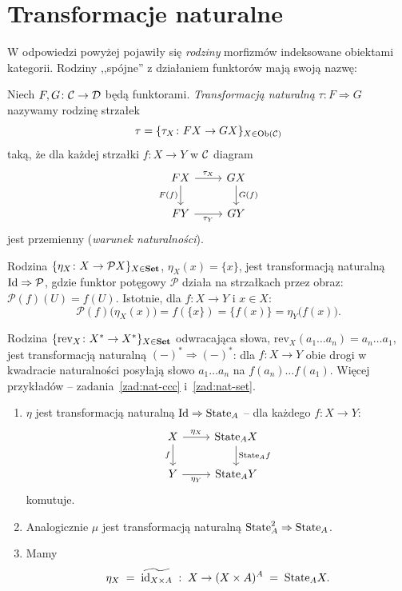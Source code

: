 \section{Transformacje naturalne}

W odpowiedzi powyżej pojawiły się \emph{rodziny} morfizmów indeksowane obiektami kategorii. Rodziny ,,spójne'' z działaniem funktorów mają swoją nazwę:

\begin{definicja}
Niech $F, G \colon \mathcal{C} \to \mathcal{D}$ będą funktorami. \emph{Transformacją naturalną} $\tau \colon F \Rightarrow G$ nazywamy rodzinę strzałek
\[
\tau = \{\tau_X \colon F X \to G X\}_{X \in \mathrm{Ob}(\mathcal{C})}
\]
taką, że dla każdej strzałki $f \colon X \to Y$ w $\mathcal{C}$ diagram
\[
\begin{tikzcd}
F X \arrow[r, "\tau_X"] \arrow[d, "F(f)"'] & G X \arrow[d, "G(f)"] \\
F Y \arrow[r, "\tau_Y"'] & G Y
\end{tikzcd}
\]
jest przemienny (\emph{warunek naturalności}).
\end{definicja}

\begin{przyklad}
Rodzina $\{\eta_X \colon X \to \mathcal{P}X\}_{X \in \mathbf{Set}}$, $\eta_X(x) = \{x\}$, jest transformacją naturalną $\mathrm{Id} \Rightarrow \mathcal{P}$, gdzie funktor potęgowy $\mathcal{P}$ działa na strzałkach przez obraz: $\mathcal{P}(f)(U) = f(U)$. Istotnie, dla $f \colon X \to Y$ i $x \in X$:
\[
\mathcal{P}(f)\bigl(\eta_X(x)\bigr) = f(\{x\}) = \{f(x)\} = \eta_Y\bigl(f(x)\bigr).
\]
\end{przyklad}

\begin{przyklad}
Rodzina $\{\mathrm{rev}_X \colon X^* \to X^*\}_{X \in \mathbf{Set}}$ odwracająca słowa, $\mathrm{rev}_X(a_1 \ldots a_n) = a_n \ldots a_1$, jest transformacją naturalną $(-)^* \Rightarrow (-)^*$: dla $f \colon X \to Y$ obie drogi w kwadracie naturalności posyłają słowo $a_1 \ldots a_n$ na $f(a_n) \ldots f(a_1)$. Więcej przykładów -- zadania~\ref{zad:nat-ccc} i~\ref{zad:nat-set}.
\end{przyklad}

\begin{uwaga}
\begin{enumerate}
\item $\eta$ jest transformacją naturalną $\mathrm{Id} \Rightarrow \mathrm{State}_A$ -- dla każdego $f : X \to Y$:
\[
\begin{tikzcd}
X \arrow[r, "\eta_X"] \arrow[d, "f"'] & \State_A X \arrow[d, "\State_A f"] \\
Y \arrow[r, "\eta_Y"'] & \State_A Y
\end{tikzcd}
\]
komutuje.
\item Analogicznie $\mu$ jest transformacją naturalną $\mathrm{State}_A^2 \Rightarrow \mathrm{State}_A$.
\item Mamy
\[
\eta_X \;=\; \widetilde{\mathrm{id}_{X \times A}} \;:\; X \to (X \times A)^A \;=\; \mathrm{State}_A X.
\]
\end{enumerate}
\end{uwaga}

